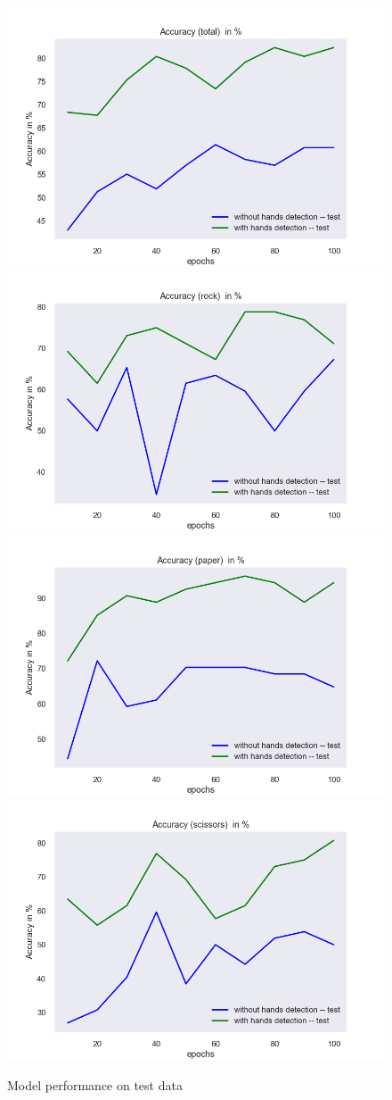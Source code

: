 \documentclass[a4paper]{article}
\begin{document}
\begin{figure}
    \includegraphics[width=.49\textwidth]{img/experiment/model_comp_10steps__test_acc_total.png}\hfill
    \includegraphics[width=.49\textwidth]{img/experiment/model_comp_10steps__test_acc_rock.png}\hfill
    \\[\smallskipamount]
    \includegraphics[width=.49\textwidth]{img/experiment/model_comp_10steps__test_acc_paper.png}\hfill
    \includegraphics[width=.49\textwidth]{img/experiment/model_comp_10steps__test_acc_scissors.png}\hfill
    \caption{Model performance on test data}
    \label{fig:exp-de-acc-test}
\end{figure}
\end{document}
